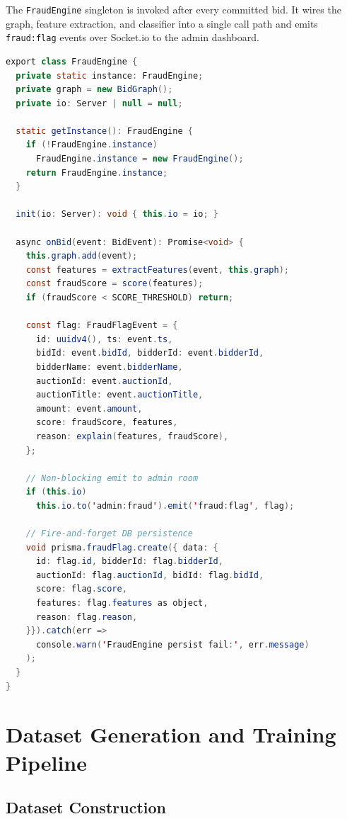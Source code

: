 \documentclass[11pt]{article}
\begin{document}
The \texttt{FraudEngine} singleton is invoked after every committed bid.
It wires the graph, feature extraction, and classifier into a single
call path and emits \texttt{fraud:flag} events over Socket.io to the
admin dashboard.

\begin{lstlisting}[language=Java,caption={Singleton fraud engine orchestrating the detection pipeline.}]
export class FraudEngine {
  private static instance: FraudEngine;
  private graph = new BidGraph();
  private io: Server | null = null;

  static getInstance(): FraudEngine {
    if (!FraudEngine.instance)
      FraudEngine.instance = new FraudEngine();
    return FraudEngine.instance;
  }

  init(io: Server): void { this.io = io; }

  async onBid(event: BidEvent): Promise<void> {
    this.graph.add(event);
    const features = extractFeatures(event, this.graph);
    const fraudScore = score(features);
    if (fraudScore < SCORE_THRESHOLD) return;

    const flag: FraudFlagEvent = {
      id: uuidv4(), ts: event.ts,
      bidId: event.bidId, bidderId: event.bidderId,
      bidderName: event.bidderName,
      auctionId: event.auctionId,
      auctionTitle: event.auctionTitle,
      amount: event.amount,
      score: fraudScore, features,
      reason: explain(features, fraudScore),
    };

    // Non-blocking emit to admin room
    if (this.io)
      this.io.to('admin:fraud').emit('fraud:flag', flag);

    // Fire-and-forget DB persistence
    void prisma.fraudFlag.create({ data: {
      id: flag.id, bidderId: flag.bidderId,
      auctionId: flag.auctionId, bidId: flag.bidId,
      score: flag.score,
      features: flag.features as object,
      reason: flag.reason,
    }}).catch(err =>
      console.warn('FraudEngine persist fail:', err.message)
    );
  }
}
\end{lstlisting}

\section{Dataset Generation and Training Pipeline}
\label{sec:dataset}

\subsection{Dataset Construction}
\end{document}
